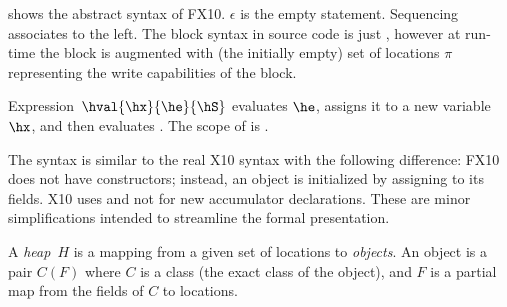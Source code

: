  shows the abstract syntax of FX10. 
$\epsilon$ is the empty statement. Sequencing associates to the left.
The block syntax in source code is just \code{\{\hS\}},
however at run-time the block is augmented with (the initially empty) set of locations
$\pi$ representing the write capabilities of the block.

Expression~$\hval{\hx}{\he}{\hS}$ evaluates $\he$, assigns it to a
new variable $\hx$, and then evaluates \hS. The scope of \hx{} is \hS.

The syntax is similar to the real X10 syntax with the following difference:
FX10 does not have constructors; instead, an object is initialized by
assigning to its fields. X10 uses  and not  for new
accumulator declarations. These are minor simplifications intended to
streamline the formal presentation.

A {\em heap}~$H$ is a mapping from a given set of locations to {\em
  objects}. An object is a pair $C(F)$ where $C$ is a class (the exact
class of the object), and $F$ is a partial map from the fields of $C$
to locations.




